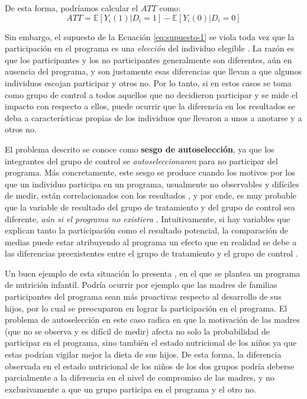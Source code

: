 \documentclass[../../main.tex]{subfiles}
\begin{document}
De esta forma, podríamos calcular el \(ATT\) como:
\begin{equation}
    ATT = \mathbb{E} \left[Y_i(1)|D_i=1\right] - \mathbb{E} \left[Y_i(0)|D_i=0\right]
    \label{eq:ATT-con-supuesto-IC}
\end{equation}

Sin embargo, el supuesto de la Ecuación \ref{eq:supuesto-1} se viola toda vez que la
participación en el programa es una \textit{elección} del individuo elegible
\cite{bernal}. La razón es que los participantes y los no participantes generalmente son
diferentes, aún en ausencia del programa, y son justamente esas diferencias que llevan a
que algunos individuos escojan participar y otros no. Por lo tanto, si en estos casos se
toma como grupo de control a todos aquellos que no decidieron participar y se mide el
impacto con respecto a ellos, puede ocurrir que la diferencia en los resultados se deba a
características propias de los individuos que llevaron a unos a anotarse y a otros no.

El problema descrito se conoce como \textbf{sesgo de autoselección}, ya que los
integrantes del grupo de control se \textit{autoseleccionaron} para no participar del
programa. Más concretamente, este sesgo se produce cuando los motivos por los que un
individuo participa en un programa, usualmente no observables y difíciles de medir, están
correlacionados con los resultados \cite{gertler-2016}, y por ende, es muy probable que la
variable de resultado del grupo de tratamiento y del grupo de control sea diferente,
\textit{aún si el programa no existiera} \cite{bernal}. Intuitivamente, si hay variables
que explican tanto la participación como el resultado potencial, la comparación de medias
puede estar atribuyendo al programa un efecto que en realidad se debe a las diferencias
preexistentes entre el grupo de tratamiento y el grupo de control \cite{bernal}.

Un buen ejemplo de esta situación lo presenta \cite{bernal}, en el que se plantea un
programa de nutrición infantil. Podría ocurrir por ejemplo que las madres de familias
participantes del programa sean más proactivas respecto al desarrollo de sus hijos, por lo
cual se preocuparon en lograr la participación en el programa. El problema de
autoselección en este caso radica en que la motivación de las madres (que no se observa y
es difícil de medir) afecta no solo la probabilidad de participar en el programa, sino
también el estado nutricional de los niños ya que estas podrían vigilar mejor la dieta de
sus hijos. De esta forma, la diferencia observada en el estado nutricional de los niños de
los dos grupos podría deberse parcialmente a la diferencia en el nivel de compromiso de
las madres, y no exclusivamente a que un grupo participa en el programa y el otro no.
\end{document}
